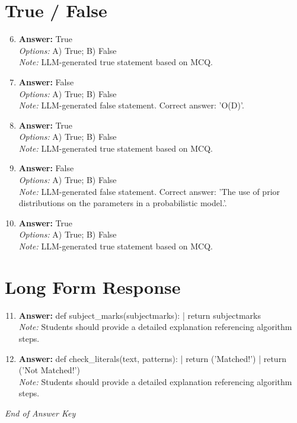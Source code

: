 \documentclass[12pt]{article}
\begin{document}
\section*{True / False}
\begin{enumerate}[label=\arabic*.]
\setcounter{enumi}{5}
\item \textbf{Answer:} True
\\ \textit{Options:} A) True; B) False
\\ \textit{Note:} LLM-generated true statement based on MCQ.
\item \textbf{Answer:} False
\\ \textit{Options:} A) True; B) False
\\ \textit{Note:} LLM-generated false statement. Correct answer: 'O(D)'.
\item \textbf{Answer:} True
\\ \textit{Options:} A) True; B) False
\\ \textit{Note:} LLM-generated true statement based on MCQ.
\item \textbf{Answer:} False
\\ \textit{Options:} A) True; B) False
\\ \textit{Note:} LLM-generated false statement. Correct answer: 'The use of prior distributions on the parameters in a probabilistic model.'.
\item \textbf{Answer:} True
\\ \textit{Options:} A) True; B) False
\\ \textit{Note:} LLM-generated true statement based on MCQ.
\end{enumerate}

\section*{Long Form Response}
\begin{enumerate}[label=\arabic*.]
\setcounter{enumi}{10}
\item \textbf{Answer:} def subject\_marks(subjectmarks): | return subjectmarks
\\ \textit{Note:} Students should provide a detailed explanation referencing algorithm steps.
\item \textbf{Answer:} def check\_literals(text, patterns): | return ('Matched!') | return ('Not Matched!')
\\ \textit{Note:} Students should provide a detailed explanation referencing algorithm steps.
\end{enumerate}

\vfill
\noindent\textit{End of Answer Key}
\end{document}
